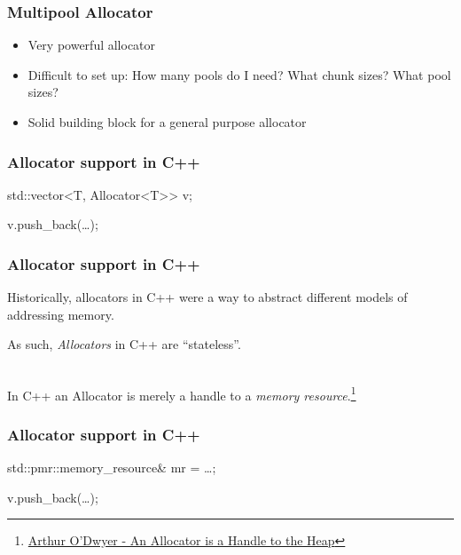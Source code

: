 \documentclass[aspectratio=43]{beamer}
\begin{document}
\begin{frame}[fragile]
  \frametitle{Multipool Allocator}
  \begin{itemize}
  \item Very powerful allocator
  \item Difficult to set up: How many pools do I need? What chunk sizes? What pool sizes?
  \item Solid building block for a general purpose allocator
  \end{itemize}
\end{frame}

\fi %


\begin{frame}[fragile]
  \frametitle{Allocator support in C++}

  \begin{semiverbatim}
std::vector<T, \alert<2>{Allocator<T>}> v;
    
v.push\_back(\ldots);
  \end{semiverbatim}

\end{frame}


\begin{frame}[fragile]
  \frametitle{Allocator support in C++}

  Historically, allocators in C++ were a way to abstract different models of addressing memory.

  As such, \textit{Allocators} in C++ are ``stateless''.  \\~\

  \pause
  \alert<2>{In C++ an Allocator is merely a handle to a \textit{memory resource}.}\footnote{\href{https://www.youtube.com/watch?v=0MdSJsCTRkY}{Arthur O'Dwyer - An Allocator is a Handle to the Heap}}
\end{frame}


\begin{frame}[fragile]
  \frametitle{Allocator support in C++}

  \begin{semiverbatim}
std::pmr::memory\_resource& mr = \ldots;
    
v.push\_back(\ldots);
  \end{semiverbatim}

  \begin{itemize}
  \end{itemize}
\end{frame}
\end{document}
